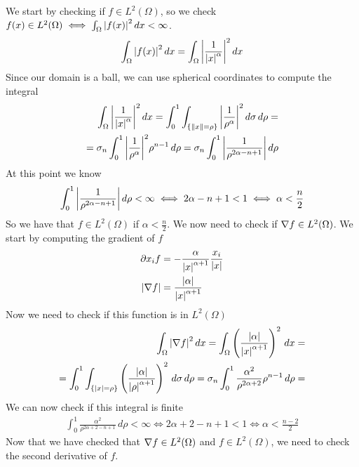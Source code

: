 We start by checking if \(f \in L^2(\Omega)\), so we check \(f(x) \in L^2(\Omega) \iff \int_\Omega \abs{f(x)}^2 \, dx < \infty\).
\[
    \begin{split}
        \int_\Omega \abs{f(x)}^2 \, dx = \int_\Omega \abs{\frac{1}{\abs{x}^\alpha}}^2 \, dx
    \end{split}
\]
Since our domain is a ball, we can use spherical coordinates to compute the integral
\[
    \begin{split}
        \int_\Omega \abs{\frac{1}{\abs{x}^\alpha}}^2 \, dx = \int_0^1 \int_{\left\{\norm{x} = \rho\right\}} \abs{\frac{1}{\rho^\alpha}}^2 \, d\sigma \, d\rho = \\
        = \sigma_n \int_0^1 \abs{\frac{1}{\rho^\alpha}}^2 \rho^{n-1} \, d\rho = \sigma_n \int_0^1 \abs{\frac{1}{\rho^{2\alpha - n +1}}} \, d\rho
    \end{split}
\]
At this point we know 
\[
    \begin{split}
        \int_0^1 \abs{\frac{1}{\rho^{2\alpha - n + 1}}} \, d\rho < \infty \iff 2 \alpha - n + 1 < 1 \iff \alpha < \frac{n}{2}
    \end{split}
\]
So we have that \(f \in L^2(\Omega)\) if \(\alpha < \frac{n}{2}\). We now need to check if \(\nabla f \in L^2(\Omega)\). We start by computing the gradient of \(f\)
\[
    \begin{split}
        \partial x_i f &= -\frac{\alpha}{\abs{x}^{\alpha + 1}} \frac{x_i}{\abs{x}}  \\
        \abs{\nabla f} &= \frac{\abs{\alpha}}{\abs{x}^{\alpha + 1}}
    \end{split}
\]
Now we need to check if this function is in \(L^2(\Omega)\)
\[
    \begin{split}
        \int_\Omega \abs{\nabla f}^2 \, dx = \int_\Omega \left(\frac{\abs{\alpha}}{\abs{x}^{\alpha + 1}}\right)^2 \, dx = \\
        = \int_0^1 \int_{\left\{\abs{x} = \rho\right\}} \left(\frac{\abs{\alpha}}{\abs{\rho}^{\alpha + 1}}\right)^2 \, d\sigma \, d\rho = \sigma_n \int_0^1 \frac{\alpha^2}{\rho^{2\alpha + 2}} \rho^{n-1} \, d\rho = \\
    \end{split}
\]
We can now check if this integral is finite
\[
    \begin{split}
        \int_0^1 \frac{\alpha^2}{\rho^{2\alpha + 2 - n + 1}} \, d\rho < \infty \iff 2\alpha + 2 - n + 1 < 1 \iff \alpha < \frac{n - 2}{2}
    \end{split}
\]
Now that we have checked that \(\nabla f \in L^2(\Omega)\) and \(f \in L^2(\Omega)\), we need to check the second derivative of \(f\).

